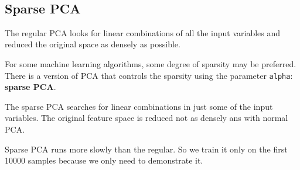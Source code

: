 \documentclass[11pt]{article}
\begin{document}
    \begin{center}
    \end{center}
    { \hspace*{\fill} \\}
    
    \subsection{Sparse PCA}\label{sparse-pca}

The regular PCA looks for linear combinations of all the input variables
and reduced the original space as densely as possible.

For some machine learning algorithms, some degree of sparsity may be
preferred. There is a version of PCA that controls the sparsity using
the parameter \texttt{alpha}: \textbf{sparse PCA}.

The sparse PCA searches for linear combinations in just some of the
input variables. The original feature space is reduced not as densely
ans with normal PCA.

Sparse PCA runs more slowly than the regular. So we train it only on the
first 10000 samples because we only need to demonstrate it.
\end{document}
